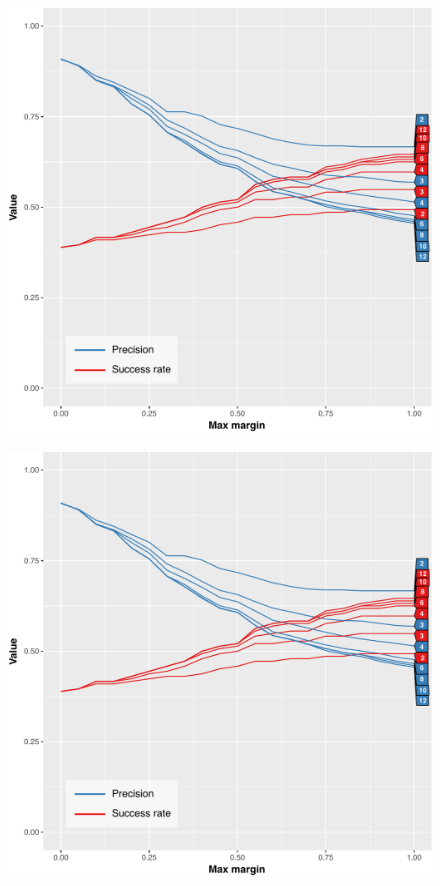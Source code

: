 \documentclass[thesis.tex]{subfiles}
\begin{document}
\begin{figure}[h]
\centering \includegraphics[page=2,width=\textwidth,height=\textheight,keepaspectratio=true]{images/experiment/match_precision}
\end{figure}
\begin{figure}[h]
\centering \includegraphics[page=3,width=\textwidth,height=\textheight,keepaspectratio=true]{images/experiment/match_precision}
\end{figure}
\end{document}
